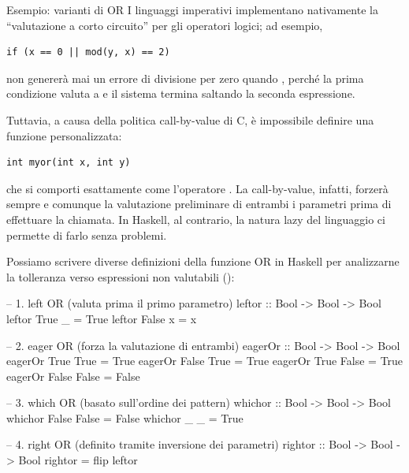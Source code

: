 \begin{gframe}{Esempio: varianti di OR}
I linguaggi imperativi implementano nativamente la ``valutazione a corto circuito'' per gli operatori logici; ad esempio,
\begin{verbatim}
if (x == 0 || mod(y, x) == 2)
\end{verbatim}
non genererà mai un errore di divisione per zero quando , perché la prima condizione valuta a  e il sistema termina saltando la seconda espressione. 

Tuttavia, a causa della politica call-by-value di C, è impossibile definire una funzione personalizzata:
\begin{verbatim}
int myor(int x, int y)
\end{verbatim}
che si comporti esattamente come l'operatore \code{||}. La call-by-value, infatti, forzerà sempre e comunque la valutazione preliminare di entrambi i parametri prima di effettuare la chiamata. In Haskell, al contrario, la natura lazy del linguaggio ci permette di farlo senza problemi.

Possiamo scrivere diverse definizioni della funzione OR in Haskell per analizzarne la tolleranza verso espressioni non valutabili ():

\begin{haskellbox}{}
-- 1. left OR (valuta prima il primo parametro)
leftor :: Bool -> Bool -> Bool
leftor True  _ = True
leftor False x = x

-- 2. eager OR (forza la valutazione di entrambi)
eagerOr :: Bool -> Bool -> Bool
eagerOr True  True  = True
eagerOr False True  = True
eagerOr True  False = True
eagerOr False False = False

-- 3. which OR (basato sull'ordine dei pattern)
whichor :: Bool -> Bool -> Bool
whichor False False = False
whichor _     _     = True

-- 4. right OR (definito tramite inversione dei parametri)
rightor :: Bool -> Bool -> Bool
rightor = flip leftor
\end{haskellbox}


\end{gframe}
